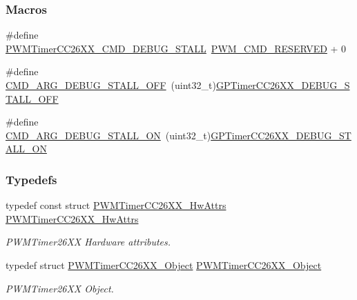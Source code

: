 \subsubsection*{Macros}
\begin{DoxyCompactItemize}
\item 
\#define \hyperlink{_p_w_m_timer_c_c26_x_x_8h_af011898e1f39f5c46e5bee16da53f893}{P\+W\+M\+Timer\+C\+C26\+X\+X\+\_\+\+C\+M\+D\+\_\+\+D\+E\+B\+U\+G\+\_\+\+S\+T\+A\+L\+L}~\hyperlink{_p_w_m_8h_ad731f4db58c72d280900da4be6e3434c}{P\+W\+M\+\_\+\+C\+M\+D\+\_\+\+R\+E\+S\+E\+R\+V\+E\+D} + 0
\item 
\#define \hyperlink{_p_w_m_timer_c_c26_x_x_8h_a89d7c2f8674a7adb6d904b9cfb94c509}{C\+M\+D\+\_\+\+A\+R\+G\+\_\+\+D\+E\+B\+U\+G\+\_\+\+S\+T\+A\+L\+L\+\_\+\+O\+F\+F}~(uint32\+\_\+t)\hyperlink{_g_p_timer_c_c26_x_x_8h_ab4c80c79c9acaf8e482e8244adbae73ea1aca5e7c45ce80046cc86c309b1500b3}{G\+P\+Timer\+C\+C26\+X\+X\+\_\+\+D\+E\+B\+U\+G\+\_\+\+S\+T\+A\+L\+L\+\_\+\+O\+F\+F}
\item 
\#define \hyperlink{_p_w_m_timer_c_c26_x_x_8h_a922b8318640c67c3c20a4e991e9b486d}{C\+M\+D\+\_\+\+A\+R\+G\+\_\+\+D\+E\+B\+U\+G\+\_\+\+S\+T\+A\+L\+L\+\_\+\+O\+N}~(uint32\+\_\+t)\hyperlink{_g_p_timer_c_c26_x_x_8h_ab4c80c79c9acaf8e482e8244adbae73ea78ecad7414438f969450881393850b8c}{G\+P\+Timer\+C\+C26\+X\+X\+\_\+\+D\+E\+B\+U\+G\+\_\+\+S\+T\+A\+L\+L\+\_\+\+O\+N}
\end{DoxyCompactItemize}
\subsubsection*{Typedefs}
\begin{DoxyCompactItemize}
\item 
typedef const struct \hyperlink{struct_p_w_m_timer_c_c26_x_x___hw_attrs}{P\+W\+M\+Timer\+C\+C26\+X\+X\+\_\+\+Hw\+Attrs} \hyperlink{_p_w_m_timer_c_c26_x_x_8h_aebb4ec3a260d16ddb9e441f4cd9fde6b}{P\+W\+M\+Timer\+C\+C26\+X\+X\+\_\+\+Hw\+Attrs}
\begin{DoxyCompactList}\small\item\em P\+W\+M\+Timer26\+X\+X Hardware attributes. \end{DoxyCompactList}\item 
typedef struct \hyperlink{struct_p_w_m_timer_c_c26_x_x___object}{P\+W\+M\+Timer\+C\+C26\+X\+X\+\_\+\+Object} \hyperlink{_p_w_m_timer_c_c26_x_x_8h_a655ae995c6140ecdc5e97abf2f89c8ab}{P\+W\+M\+Timer\+C\+C26\+X\+X\+\_\+\+Object}
\begin{DoxyCompactList}\small\item\em P\+W\+M\+Timer26\+X\+X Object. \end{DoxyCompactList}\end{DoxyCompactItemize}



